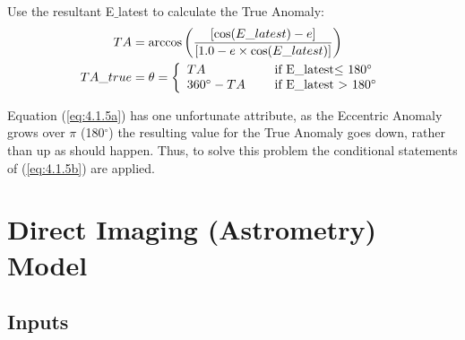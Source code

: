 \documentclass[10pt,preprint]{aastex}
\begin{document}
Use the resultant E$\_$latest to calculate the True Anomaly:
\begin{subequations}
\begin{align}
\label{eq:4.1.5a}
TA& = \arccos \bigg( \frac{[\cos(E\_latest) - e]}{[1.0 - e \times \cos(E\_latest)]} \bigg)\\
\label{eq:4.1.5b}
TA\_true& = \theta = \left\{ \begin{array}{l l} TA& \quad \text{ if E$\_$latest$\leq$ 180$^{\circ}$}\\ 360^{\circ}  - TA& \quad \text{ if E$\_$latest $>$ 180$^{\circ}$} \end{array}\right.
\end{align}
\end{subequations}

Equation (\ref{eq:4.1.5a}) has one unfortunate attribute, as the Eccentric Anomaly grows over $\pi$ (180$^{\circ}$) the resulting value for the True Anomaly goes down, rather than up as should happen.  Thus, to solve this problem the conditional statements of (\ref{eq:4.1.5b}) are applied.\\  
\pagebreak


\section{Direct Imaging (Astrometry) Model}
\subsection{Inputs}
\end{document}
